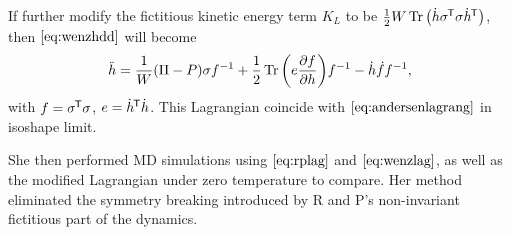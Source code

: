 If further modify the fictitious kinetic energy term $K_L$ to be
$ \frac{ 1 }{ 2 } W \operatorname{Tr} \big( \dot{ h } \sigma^{\mkern-1.5mu\mathsf{T}} \sigma \dot{ h }^{\mkern-1.5mu\mathsf{T}} \big)$,
then $\eqref{eq:wenzhdd}$ will become
\begin{equation}\label{eq:wenzhdd2}
	\ddot{h} = \frac{ 1 }{ W } (\Pi - P) \sigma f^{-1} + \frac{ 1 }{ 2 }
	\operatorname{Tr} \bigg( e \frac{ \partial f }{ \partial h } \bigg) f^{-1}
	- \dot{h} \dot{ f } f^{-1},
\end{equation}
with $f = \sigma ^{\mkern-1.5mu\mathsf{T}} \sigma$, $e = \dot{ h }^{\mkern-1.5mu\mathsf{T}} \dot{ h }$. This
Lagrangian coincide with $\eqref{eq:andersenlagrang}$ in
isoshape limit.

She then performed MD simulations using $\eqref{eq:rplag}$ and
$\eqref{eq:wenzlag}$, as well as the modified Lagrangian under zero
temperature to compare. Her method eliminated the symmetry breaking
introduced by R and P's non-invariant fictitious part of the dynamics.
